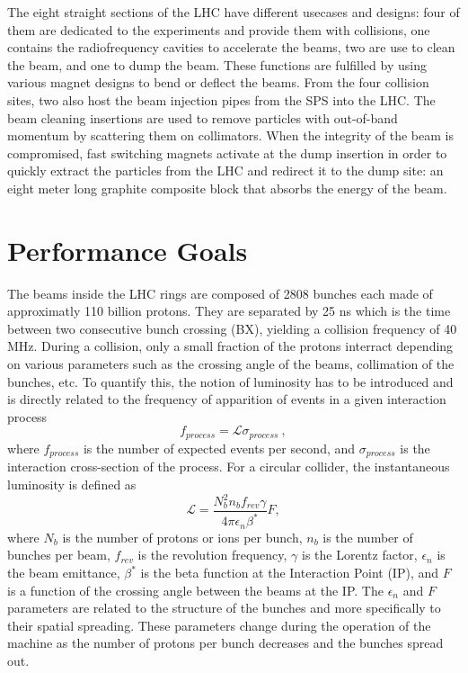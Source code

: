     The eight straight sections of the LHC have different usecases and designs: four of them are dedicated to the experiments and provide them with collisions, one contains the radiofrequency cavities to accelerate the beams, two are use to clean the beam, and one to dump the beam. These functions are fulfilled by using various magnet designs to bend or deflect the beams. From the four collision sites, two also host the beam injection pipes from the SPS into the LHC. The beam cleaning insertions are used to remove particles with out-of-band momentum by scattering them on collimators. When the integrity of the beam is compromised, fast switching magnets activate at the dump insertion in order to quickly extract the particles from the LHC and redirect it to the dump site: an eight meter long graphite composite block that absorbs the energy of the beam.

	\section{Performance Goals}

  	The beams inside the LHC rings are composed of 2808 bunches each made of approximatly 110 billion protons. They are separated by 25 ns which is the time between two consecutive bunch crossing (BX), yielding a collision frequency of 40 MHz. During a collision, only a small fraction of the protons interract depending on various parameters such as the crossing angle of the beams, collimation of the bunches, etc. To quantify this, the notion of luminosity has to be introduced and is directly related to the frequency of apparition of events in a given interaction process
  	\begin{equation}
  		f_{process} = \mathcal{L} \sigma_{process} \ ,
  	\end{equation}
  	where $ f_{process} $ is the number of expected events per second, and $ \sigma_{process} $ is the interaction cross-section of the process. For a circular collider, the instantaneous luminosity is defined as
  	\begin{equation}
  		\mathcal{L} = \frac{N^2_b n_b f_{rev} \gamma}{4 \pi \epsilon_n \beta^*} F ,
  	\end{equation}
  	where $ N_b $ is the number of protons or ions per bunch, $ n_b $ is the number of bunches per beam, $ f_{rev} $ is the revolution frequency, $ \gamma $ is the Lorentz factor, $ \epsilon_n $ is the beam emittance, $ \beta^* $ is the beta function at the Interaction Point (IP), and $ F $ is a function of the crossing angle between the beams at the IP. The $ \epsilon_n $ and $ F $ parameters are related to the structure of the bunches and more specifically to their spatial spreading. These parameters change during the operation of the machine as the number of protons per bunch decreases and the bunches spread out. \\

